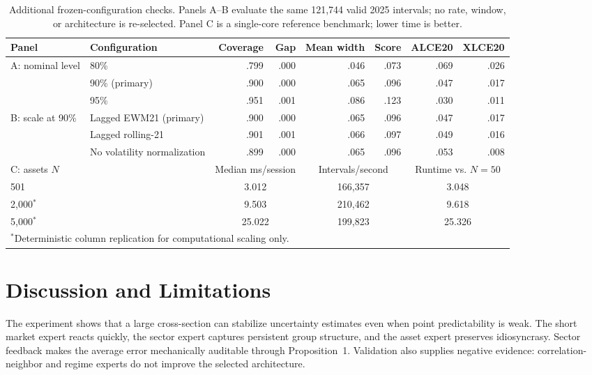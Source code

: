 \documentclass[conference]{IEEEtran}
\begin{document}
\begin{table}[t]
\centering
\caption{Additional frozen-configuration checks. Panels A--B evaluate the same 121,744 valid 2025 intervals; no rate, window, or architecture is re-selected. Panel C is a single-core reference benchmark; lower time is better.}
\label{tab:extended}
\scriptsize
\setlength{\tabcolsep}{4.2pt}
\begin{tabular}{llrrrrrr}
\toprule
Panel & Configuration & Coverage & Gap & Mean width & Score & ALCE20 & XLCE20\\
\midrule
A: nominal level & 80\% & .799 & .000 & .046 & .073 & .069 & .026\\
 & 90\% (primary) & .900 & .000 & .065 & .096 & .047 & .017\\
 & 95\% & .951 & .001 & .086 & .123 & .030 & .011\\
\midrule
B: scale at 90\% & Lagged EWM21 (primary) & .900 & .000 & .065 & .096 & .047 & .017\\
 & Lagged rolling-21 & .901 & .001 & .066 & .097 & .049 & .016\\
 & No volatility normalization & .899 & .000 & .065 & .096 & .053 & .008\\
\midrule
\multicolumn{2}{l}{C: assets $N$} & \multicolumn{2}{c}{Median ms/session} & \multicolumn{2}{c}{Intervals/second} & \multicolumn{2}{c}{Runtime vs. $N=50$}\\
\cmidrule(lr){3-4}\cmidrule(lr){5-6}\cmidrule(lr){7-8}
\multicolumn{2}{l}{501} & \multicolumn{2}{c}{3.012} & \multicolumn{2}{c}{166,357} & \multicolumn{2}{c}{3.048}\\
\multicolumn{2}{l}{2,000$^{*}$} & \multicolumn{2}{c}{9.503} & \multicolumn{2}{c}{210,462} & \multicolumn{2}{c}{9.618}\\
\multicolumn{2}{l}{5,000$^{*}$} & \multicolumn{2}{c}{25.022} & \multicolumn{2}{c}{199,823} & \multicolumn{2}{c}{25.326}\\
\multicolumn{8}{l}{\scriptsize $^{*}$Deterministic column replication for computational scaling only.}\\
\bottomrule
\end{tabular}
\end{table}

\section{Discussion and Limitations}

The experiment shows that a large cross-section can stabilize uncertainty estimates even when point predictability is weak. The short market expert reacts quickly, the sector expert captures persistent group structure, and the asset expert preserves idiosyncrasy. Sector feedback makes the average error mechanically auditable through Proposition~1. Validation also supplies negative evidence: correlation-neighbor and regime experts do not improve the selected architecture.
\end{document}

